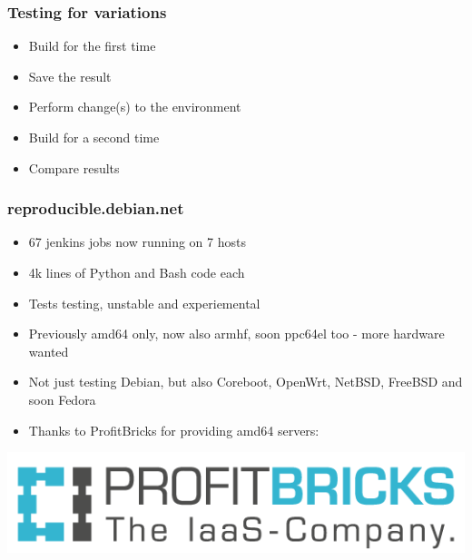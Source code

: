 \documentclass[14pt]{beamer}
\begin{document}
\begin{frame}
 \frametitle{Testing for variations}

 \begin{itemize}
  \item Build for the first time
  \item Save the result
  \item Perform change(s) to the environment
  \item Build for a second time
  \item Compare results
 \end{itemize}
\end{frame}

\begin{frame}
 \frametitle{reproducible.debian.net}

 \begin{itemize}
  \item 67 jenkins jobs now running on 7 hosts
  \item 4k lines of Python and Bash code each
  \item Tests testing, unstable and experiemental
  \item Previously amd64 only, now also armhf, soon ppc64el too - more hardware wanted
  \item Not just testing Debian, but also Coreboot, OpenWrt, NetBSD, FreeBSD and soon Fedora
  \item Thanks to ProfitBricks for providing amd64 servers:
 \end{itemize}
 \vfill
 \begin{center}
 \includegraphics[height=0.15\paperheight]{images/profitbricks_logo.png}
 \end{center}
\end{frame}
\end{document}
